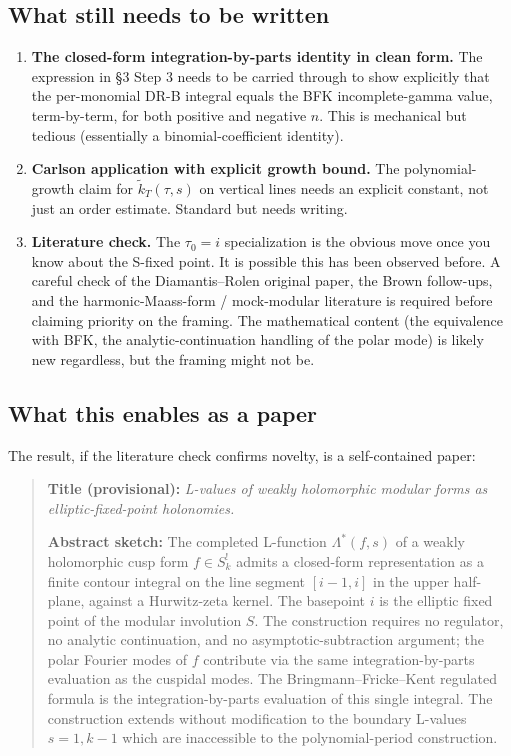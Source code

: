 \documentclass[11pt]{article}
\begin{document}
\subsection*{What still needs to be written}

\begin{enumerate}
\item \textbf{The closed-form integration-by-parts identity in clean form.} The expression in \S3 Step 3 needs to be carried through to show explicitly that the per-monomial DR-B integral equals the BFK incomplete-gamma value, term-by-term, for both positive and negative $n$. This is mechanical but tedious (essentially a binomial-coefficient identity).
\item \textbf{Carlson application with explicit growth bound.} The polynomial-growth claim for $\widetilde{k}_T(\tau, s)$ on vertical lines needs an explicit constant, not just an order estimate. Standard but needs writing.
\item \textbf{Literature check.} The $\tau_0 = i$ specialization is the obvious move once you know about the S-fixed point. It is possible this has been observed before. A careful check of the Diamantis--Rolen original paper, the Brown follow-ups, and the harmonic-Maass-form / mock-modular literature is required before claiming priority on the framing. The mathematical content (the equivalence with BFK, the analytic-continuation handling of the polar mode) is likely new regardless, but the framing might not be.
\end{enumerate}

\subsection*{What this enables as a paper}

The result, if the literature check confirms novelty, is a self-contained paper:

\begin{quote}
\textbf{Title (provisional):} \emph{L-values of weakly holomorphic modular forms as elliptic-fixed-point holonomies.}

\textbf{Abstract sketch:} The completed L-function $\Lambda^*(f, s)$ of a weakly holomorphic cusp form $f \in S^!_k$ admits a closed-form representation as a finite contour integral on the line segment $[i-1, i]$ in the upper half-plane, against a Hurwitz-zeta kernel. The basepoint $i$ is the elliptic fixed point of the modular involution $S$. The construction requires no regulator, no analytic continuation, and no asymptotic-subtraction argument; the polar Fourier modes of $f$ contribute via the same integration-by-parts evaluation as the cuspidal modes. The Bringmann--Fricke--Kent regulated formula is the integration-by-parts evaluation of this single integral. The construction extends without modification to the boundary L-values $s = 1, k-1$ which are inaccessible to the polynomial-period construction.
\end{quote}
\end{document}
